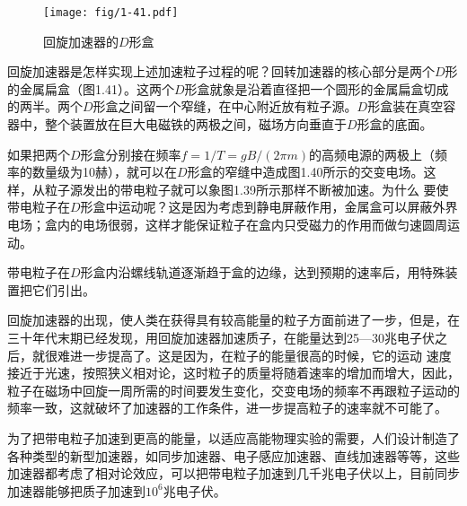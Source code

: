 \begin{figure}[htp]
\centering
\texttt{[image: fig/1-41.pdf]}
\caption{回旋加速器的$D$形盒}
\end{figure}

回旋加速器是怎样实现上述加速粒子过程的呢？回转加速器的核心部分是两个$D$形的金属扁盒（图1.41）。这两个$D$形盒就象是沿着直径把一个圆形的金属扁盒切成的两半。两个$D$形盒之间留一个窄缝，在中心附近放有粒子源。$D$形盒装在真空容器中，整个装置放在巨大电磁铁的两极之间，磁场方向垂直于$D$形盒的底面。

如果把两个$D$形盒分别接在频率$f=1/T=gB/(2\pi m)$的高频电源的两极上（频率的数量级为10赫），就可以在$D$形盒的窄缝中造成图1.40所示的交变电场。这样，从粒子源发出的带电粒子就可以象图1.39所示那样不断被加速。为什么
要使带电粒子在$D$形盒中运动呢？这是因为考虑到静电屏蔽作用，金属盒可以屏蔽外界电场；盒内的电场很弱，这样才能保证粒子在盒内只受磁力的作用而做匀速圆周运动。

带电粒子在$D$形盒内沿螺线轨道逐渐趋于盒的边缘，达到预期的速率后，用特殊装置把它们引出。

回旋加速器的出现，使人类在获得具有较高能量的粒子方面前进了一步，但是，在三十年代末期已经发现，用回旋加速器加速质子，在能量达到25—30兆电子伏之后，就很难进一步提高了。这是因为，在粒子的能量很高的时候，它的运动
速度接近于光速，按照狭义相对论，这时粒子的质量将随着速率的增加而增大，因此，粒子在磁场中回旋一周所需的时间要发生变化，交变电场的频率不再跟粒子运动的频率一致，这就破坏了加速器的工作条件，进一步提高粒子的速率就不可能了。

为了把带电粒子加速到更高的能量，以适应高能物理实验的需要，人们设计制造了各种类型的新型加速器，如同步加速器、电子感应加速器、直线加速器等等，这些加速器都考虑了相对论效应，可以把带电粒子加速到几千兆电子伏以上，目前同步加速器能够把质子加速到$10^6$兆电子伏。

